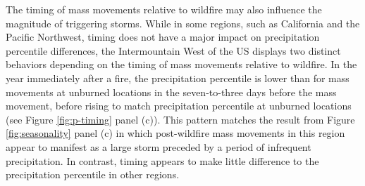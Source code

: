 \documentclass[nhess, manuscript]{copernicus}
\begin{document}
The timing of mass movements relative to wildfire may also influence the magnitude of triggering storms. While in some regions, such as California and the Pacific Northwest, timing does not have a major impact on precipitation percentile differences, the Intermountain West of the US displays two distinct behaviors depending on the timing of mass movements relative to wildfire. In the year immediately after a fire, the precipitation percentile is lower than for mass movements at unburned locations in the seven-to-three days before the mass movement, before rising to match precipitation percentile at unburned locations (see Figure \ref{fig:p-timing} panel (c)). This pattern matches the result from Figure \ref{fig:seasonality} panel (c) in which post-wildfire mass movements in this region appear to manifest as a large storm preceded by a period of infrequent precipitation. In contrast, timing appears to make little difference to the precipitation percentile in other regions.
\end{document}
